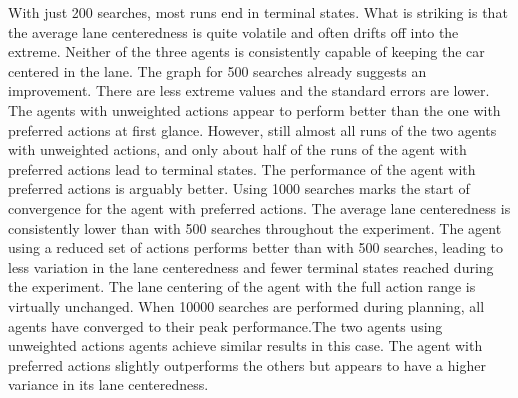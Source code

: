 With just 200 searches, most runs end in terminal states. What is striking is that the average lane centeredness is quite volatile and often drifts off into the extreme. Neither of the three agents is consistently capable of keeping the car centered in the lane. The graph for 500 searches already suggests an improvement. There are less extreme values and the standard errors are lower. The agents with unweighted actions appear to perform better than the one with preferred actions at first glance. However, still almost all runs of the two agents with unweighted actions, and only about half of the runs of the agent with preferred actions lead to terminal states. The performance of the agent with preferred actions is arguably better. Using 1000 searches marks the start of convergence for the agent with preferred actions. The average lane centeredness is consistently lower than with 500 searches throughout the experiment. The agent using a reduced set of actions performs better than with 500 searches, leading to less variation in the lane centeredness and fewer terminal states reached during the experiment. The lane centering of the agent with the full action range is virtually unchanged. When 10000 searches are performed during planning, all agents have converged to their peak performance.The two agents using unweighted actions agents achieve similar results in this case. The agent with preferred actions slightly outperforms the others but appears to have a higher variance in its lane centeredness.



